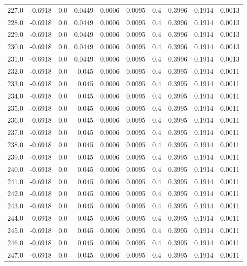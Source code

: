\begin{longtable}{lrrrrrrrrr}
227.0 & -0.6918 & 0.0 & 0.0449 & 0.0006 & 0.0095 & 0.4 & 0.3996 & 0.1914 & 0.0013 \\
228.0 & -0.6918 & 0.0 & 0.0449 & 0.0006 & 0.0095 & 0.4 & 0.3996 & 0.1914 & 0.0013 \\
229.0 & -0.6918 & 0.0 & 0.0449 & 0.0006 & 0.0095 & 0.4 & 0.3996 & 0.1914 & 0.0013 \\
230.0 & -0.6918 & 0.0 & 0.0449 & 0.0006 & 0.0095 & 0.4 & 0.3996 & 0.1914 & 0.0013 \\
231.0 & -0.6918 & 0.0 & 0.0449 & 0.0006 & 0.0095 & 0.4 & 0.3996 & 0.1914 & 0.0013 \\
232.0 & -0.6918 & 0.0 & 0.045 & 0.0006 & 0.0095 & 0.4 & 0.3995 & 0.1914 & 0.0011 \\
233.0 & -0.6918 & 0.0 & 0.045 & 0.0006 & 0.0095 & 0.4 & 0.3995 & 0.1914 & 0.0011 \\
234.0 & -0.6918 & 0.0 & 0.045 & 0.0006 & 0.0095 & 0.4 & 0.3995 & 0.1914 & 0.0011 \\
235.0 & -0.6918 & 0.0 & 0.045 & 0.0006 & 0.0095 & 0.4 & 0.3995 & 0.1914 & 0.0011 \\
236.0 & -0.6918 & 0.0 & 0.045 & 0.0006 & 0.0095 & 0.4 & 0.3995 & 0.1914 & 0.0011 \\
237.0 & -0.6918 & 0.0 & 0.045 & 0.0006 & 0.0095 & 0.4 & 0.3995 & 0.1914 & 0.0011 \\
238.0 & -0.6918 & 0.0 & 0.045 & 0.0006 & 0.0095 & 0.4 & 0.3995 & 0.1914 & 0.0011 \\
239.0 & -0.6918 & 0.0 & 0.045 & 0.0006 & 0.0095 & 0.4 & 0.3995 & 0.1914 & 0.0011 \\
240.0 & -0.6918 & 0.0 & 0.045 & 0.0006 & 0.0095 & 0.4 & 0.3995 & 0.1914 & 0.0011 \\
241.0 & -0.6918 & 0.0 & 0.045 & 0.0006 & 0.0095 & 0.4 & 0.3995 & 0.1914 & 0.0011 \\
242.0 & -0.6918 & 0.0 & 0.045 & 0.0006 & 0.0095 & 0.4 & 0.3995 & 0.1914 & 0.0011 \\
243.0 & -0.6918 & 0.0 & 0.045 & 0.0006 & 0.0095 & 0.4 & 0.3995 & 0.1914 & 0.0011 \\
244.0 & -0.6918 & 0.0 & 0.045 & 0.0006 & 0.0095 & 0.4 & 0.3995 & 0.1914 & 0.0011 \\
245.0 & -0.6918 & 0.0 & 0.045 & 0.0006 & 0.0095 & 0.4 & 0.3995 & 0.1914 & 0.0011 \\
246.0 & -0.6918 & 0.0 & 0.045 & 0.0006 & 0.0095 & 0.4 & 0.3995 & 0.1914 & 0.0011 \\
247.0 & -0.6918 & 0.0 & 0.045 & 0.0006 & 0.0095 & 0.4 & 0.3995 & 0.1914 & 0.0011 \\

\end{longtable}

